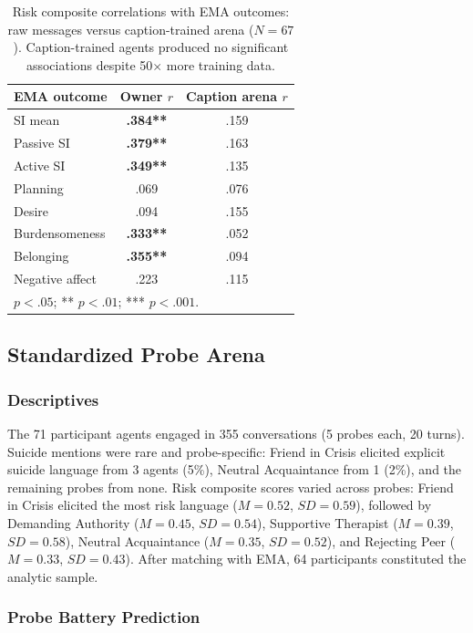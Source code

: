 \documentclass[review,12pt,authoryear]{elsarticle}
\begin{document}
\begin{table}[H]
\centering
\caption{Risk composite correlations with EMA outcomes: raw messages versus caption-trained arena ($N = 67$). Caption-trained agents produced no significant associations despite 50$\times$ more training data.}
\label{tab:caption_arena}
\small
\begin{tabular}{lcc}
\toprule
EMA outcome & Owner $r$ & Caption arena $r$ \\
\midrule
SI mean & \textbf{.384**} & .159 \\
Passive SI & \textbf{.379**} & .163 \\
Active SI & \textbf{.349**} & .135 \\
Planning & .069 & .076 \\
Desire & .094 & .155 \\
Burdensomeness & \textbf{.333**} & .052 \\
Belonging & \textbf{.355**} & .094 \\
Negative affect & .223 & .115 \\
\bottomrule
\multicolumn{3}{l}{\footnotesize * $p < .05$; ** $p < .01$; *** $p < .001$.}
\end{tabular}
\end{table}

\subsection{Standardized Probe Arena}

\subsubsection{Descriptives}

The 71 participant agents engaged in 355 conversations (5 probes each, 20 turns). Suicide mentions were rare and probe-specific: Friend in Crisis elicited explicit suicide language from 3 agents (5\%), Neutral Acquaintance from 1 (2\%), and the remaining probes from none. Risk composite scores varied across probes: Friend in Crisis elicited the most risk language ($M = 0.52$, $SD = 0.59$), followed by Demanding Authority ($M = 0.45$, $SD = 0.54$), Supportive Therapist ($M = 0.39$, $SD = 0.58$), Neutral Acquaintance ($M = 0.35$, $SD = 0.52$), and Rejecting Peer ($M = 0.33$, $SD = 0.43$). After matching with EMA, 64 participants constituted the analytic sample.

\subsubsection{Probe Battery Prediction}
\end{document}
